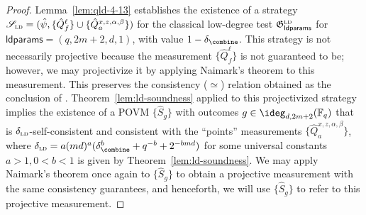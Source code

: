 \documentclass[11pt]{article}
\theoremstyle{definition}
\newcommand{\F}{\ensuremath{\mathbb{F}}}
\newcommand{\ld}{\textsc{ld}}
\newcommand{\game}{\mathfrak{G}}
\newcommand{\strategy}{\mathscr{S}}
\renewcommand{\line}{\mathbf{\ell}}
\newcommand{\ldparams}{\mathsf{ldparams}}
\begin{document}
\begin{proof}
	Lemma~\ref{lem:qld-4-13} establishes the existence of a strategy $\strategy_\ld = (\hat{\psi}, \{
        \hat{Q}^\line_f \} \cup \{ \hat{Q}^{x,z,\alpha,\beta}_a \} )$
        for the classical low-degree test $\game^\ld_\ldparams$ for
        $\ldparams = (q,2m + 2,d, 1)$, with value $1 -
        \delta_{\combine}$. This strategy is not necessarily projective because the measurement $\{\hat{Q}^{\line}_f\}$ is not guaranteed to be; however, we may projectivize it by applying Naimark's theorem to this measurement. This preserves the consistency ($\simeq$) relation obtained as the conclusion of . Theorem~\ref{lem:ld-soundness} applied to this projectivized strategy implies the
        existence of a POVM $\{ \hat{S}_g \}$ with
        outcomes $g \in \ideg_{d,2m+2}(\F_q)$ that is
        $\delta_\ld$-self-consistent and consistent with the
        ``points'' measurements $\{ \hat{Q}^{x,z,\alpha,\beta}_a\}$,
        where $\delta_\ld = a(md)^a(\delta_\combine^b + q^{-b} + 2^{-bmd})$ for some universal constants $a > 1, 0 < b < 1$ is given
        by Theorem~\ref{lem:ld-soundness}. We may apply Naimark's theorem once again to $\{\hat{S}_g\}$ to obtain a projective measurement with the same consistency guarantees, and henceforth, we will use $\{\hat{S}_g\}$ to refer to this projective measurement.
	

\end{proof}
\end{document}
